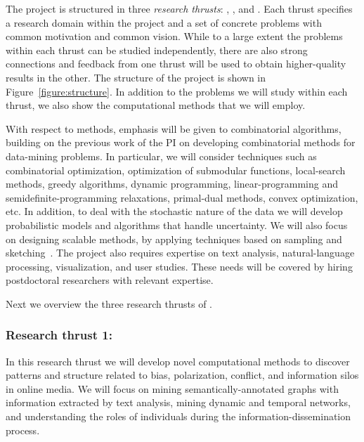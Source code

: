 \documentclass[a4paper,11pt]{article}
\begin{document}
The project is structured in three {\em research thrusts}:
\discover, \explore, and \recommend.
Each thrust specifies a research domain within the project
and a set of concrete problems with common motivation and common vision.
While to a large extent the problems within each thrust can be studied independently, 
there are also strong connections and feedback from one thrust will be used to obtain 
higher-quality results in the other.
The structure of the project is shown in Figure~\ref{figure:structure}.
In addition to the problems we will study within each thrust, 
we also show the computational methods that we will employ. 

\smallskip
With respect to methods, 
emphasis will be given to combinatorial algorithms,
building on the previous work of the PI 
on developing combinatorial methods for data-mining problems.
In particular, we will consider techniques such as 
combinatorial optimization, 
optimization of submodular functions, 
local-search methods, 
greedy algorithms, 
dynamic pro\-gram\-ming, 
linear-pro\-gram\-ming and semi\-def\-ini\-te-pro\-gram\-ming relaxations, 
primal-dual methods, convex optimization, etc. 
In addition, to deal with the stochastic nature of the data 
we will develop probabilistic models and algorithms that handle uncertainty.
We will also focus on designing scalable methods, 
by applying techniques based on sampling and sketching~\cite{cormode2011synopses}. 
The project also requires expertise on text analysis, 
natural-language processing, visualization, and user studies. 
These needs will be covered by hiring postdoctoral researchers with relevant expertise.

\smallskip
Next we overview the three research thrusts of \acronym.

\subsubsection*{Research thrust 1: \discover}

\noindent
\hspace{-3mm}\colorbox{verylightmagenta}{
\begin{minipage}{\textwidth}
In this research thrust we will develop novel computational methods 
to discover patterns and structure related to 
bias, polarization, conflict, and information silos in online media.
We will focus on mining se\-man\-ti\-cal\-ly-annotated graphs
with information extracted by text analysis, 
mining dynamic and temporal networks, 
and understanding the roles of individuals 
during the information-dissemination process. 
\end{minipage}}
\end{document}
